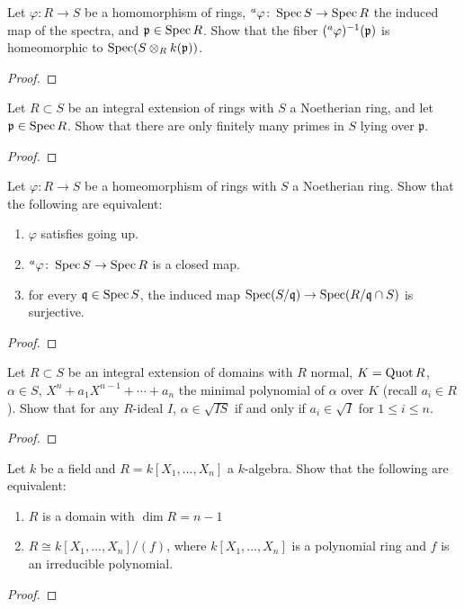 \begin{problem}
Let $\varphi\colon R\to S$ be a homomorphism of rings,
$\prescript{a}{}{\varphi}\colon \operatorname{Spec} S\to\operatorname{Spec} R$ the induced map of the
spectra, and $\mathfrak{p}\in\operatorname{Spec} R$. Show that the fiber
$(\prescript{a}{}{\varphi})^{-1}(\mathfrak{p})$ is homeomorphic to
$\operatorname{Spec}(S\otimes_R k(\mathfrak{p}))$.
\end{problem}
\begin{proof}

\end{proof}
\newpage
\begin{problem}
Let $R\subset S$ be an integral extension of rings with $S$ a Noetherian
ring, and let $\mathfrak{p}\in\operatorname{Spec} R$. Show that there are only finitely
many primes in $S$ lying over $\mathfrak{p}$.
\end{problem}
\begin{proof}
\end{proof}
\newpage
\begin{problem}
Let $\varphi\colon R\to S$ be a homeomorphism of rings with $S$ a
Noetherian ring. Show that the following are equivalent:
\begin{enumerate}[label=(\roman*)]
\item $\varphi$ satisfies going up.
\item $\prescript{a}{}\varphi\colon\operatorname{Spec} S\to\operatorname{Spec} R$ is a closed map.
\item for every $\mathfrak{q}\in\operatorname{Spec} S$, the induced map
  $\operatorname{Spec}(S/\mathfrak{q})\to\operatorname{Spec}(R/\mathfrak{q}\cap S)$ is surjective.
\end{enumerate}
\end{problem}
\begin{proof}
\end{proof}
\newpage
\begin{problem}
Let $R\subset S$ be an integral extension of domains with $R$ normal,
$K=\operatorname{Quot} R$,  $\alpha\in S$, $X^n+a_1X^{n-1}+\cdots+a_n$ the minimal
polynomial of $\alpha$ over $K$ (recall $a_i\in R$). Show that for any
$R$-ideal $I$, $\alpha\in \sqrt{IS}$ if and only if $a_i\in\sqrt{I}$ for
$1\leq i\leq n$.
\end{problem}
\begin{proof}
\end{proof}
\newpage
\begin{problem}
Let $k$ be a field and $R=k[X_1,...,X_n]$ a $k$-algebra. Show that the
following are equivalent:
\begin{enumerate}[label=(\roman*)]
\item $R$ is a domain with $\dim R=n-1$
\item $R\cong k[X_1,...,X_n]/(f)$, where $k[X_1,...,X_n]$ is a polynomial
  ring and $f$ is an irreducible polynomial.
\end{enumerate}
\end{problem}
\begin{proof}
\end{proof}

